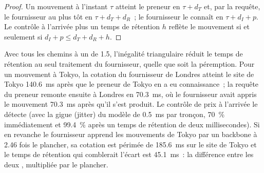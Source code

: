 \begin{proof}
Un mouvement à l'instant $\tau$ atteint le preneur en $\tau + d_T$ et, par la requête, le fournisseur au plus tôt en $\tau + d_T + d_R$~;
le fournisseur le connaît en $\tau + d_I + p$. Le contrôle à l'arrivée plus un temps de rétention $h$ reflète le mouvement si et seulement si
$d_I + p \le d_T + d_R + h$.
\end{proof}

Avec tous les chemins à un  de 1.5, l'inégalité triangulaire réduit le temps de rétention au seul traitement du fournisseur, quelle que soit
la péremption. Pour un mouvement à Tokyo, la cotation du fournisseur de Londres atteint le site de Tokyo \qty{140.6}{\milli\second} après que le preneur de Tokyo
en a eu connaissance~; la requête du preneur remonte ensuite à Londres en \qty{70.3}{\milli\second}, où le fournisseur avait appris le mouvement
\qty{70.3}{\milli\second} après qu'il s'est produit. Le contrôle de prix à l'arrivée le détecte (avec la gigue (jitter) du modèle de
\qty{0.5}{\milli\second} par tronçon, 70~\% immédiatement et 99.4~\% après un temps de rétention de deux millisecondes). Si en revanche le fournisseur apprend les mouvements de Tokyo
par un backbone à 2.46 fois le plancher, sa cotation est périmée de \qty{185.6}{\milli\second} sur le site de Tokyo et le temps de rétention qui comblerait
l'écart est \qty{45.1}{\milli\second}~: la différence entre les deux , multipliée par le plancher.

\label{lst:nw:fx-connectivity:tokyo}

